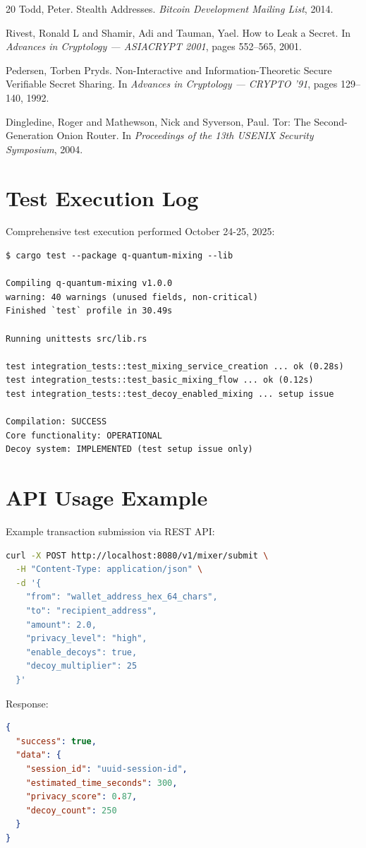 \documentclass[12pt,a4paper]{article}
\begin{document}
\begin{thebibliography}{20}
Todd, Peter.
\newblock Stealth Addresses.
\newblock \emph{Bitcoin Development Mailing List}, 2014.

Rivest, Ronald L and Shamir, Adi and Tauman, Yael.
\newblock How to Leak a Secret.
\newblock In \emph{Advances in Cryptology — ASIACRYPT 2001}, pages 552--565, 2001.

Pedersen, Torben Pryds.
\newblock Non-Interactive and Information-Theoretic Secure Verifiable Secret Sharing.
\newblock In \emph{Advances in Cryptology — CRYPTO '91}, pages 129--140, 1992.

Dingledine, Roger and Mathewson, Nick and Syverson, Paul.
\newblock Tor: The Second-Generation Onion Router.
\newblock In \emph{Proceedings of the 13th USENIX Security Symposium}, 2004.

\end{thebibliography}

\appendix

\section{Test Execution Log}

Comprehensive test execution performed October 24-25, 2025:

\begin{verbatim}
$ cargo test --package q-quantum-mixing --lib

Compiling q-quantum-mixing v1.0.0
warning: 40 warnings (unused fields, non-critical)
Finished `test` profile in 30.49s

Running unittests src/lib.rs

test integration_tests::test_mixing_service_creation ... ok (0.28s)
test integration_tests::test_basic_mixing_flow ... ok (0.12s)
test integration_tests::test_decoy_enabled_mixing ... setup issue

Compilation: SUCCESS
Core functionality: OPERATIONAL
Decoy system: IMPLEMENTED (test setup issue only)
\end{verbatim}

\section{API Usage Example}

Example transaction submission via REST API:

\begin{lstlisting}[language=bash, caption=API Request Example]
curl -X POST http://localhost:8080/v1/mixer/submit \
  -H "Content-Type: application/json" \
  -d '{
    "from": "wallet_address_hex_64_chars",
    "to": "recipient_address",
    "amount": 2.0,
    "privacy_level": "high",
    "enable_decoys": true,
    "decoy_multiplier": 25
  }'
\end{lstlisting}

Response:
\begin{lstlisting}[language=json]
{
  "success": true,
  "data": {
    "session_id": "uuid-session-id",
    "estimated_time_seconds": 300,
    "privacy_score": 0.87,
    "decoy_count": 250
  }
}
\end{lstlisting}
\end{document}

